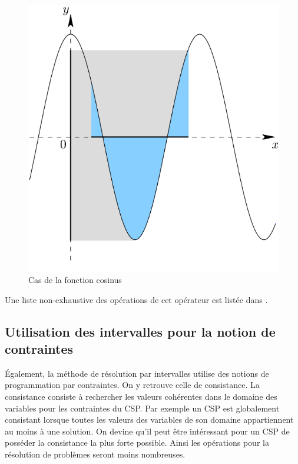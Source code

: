 \begin{figure}[h] %
  \center
\includegraphics[scale=0.30]{img/cos}
  \caption{Cas de la fonction cosinus} %
 \label{fig:Cos} %
\end{figure} %


Une liste non-exhaustive des opérations de cet opérateur est listée dans \cite{Goualard}.



\subsection{Utilisation des intervalles pour la notion de contraintes}
\'Egalement, la méthode de résolution par intervalles utilise des notions de programmation par contraintes. On y retrouve celle de consistance. La consistance consiste à rechercher les valeurs cohérentes dans le domaine des variables pour les contraintes du CSP. Par exemple un CSP est globalement consistant lorsque toutes les valeurs des variables de son domaine appartiennent au moins à une solution. On devine qu'il peut être intéressant pour un CSP de posséder la consistance la plus forte possible. Ainsi les opérations pour la résolution de problèmes seront moins nombreuses.

